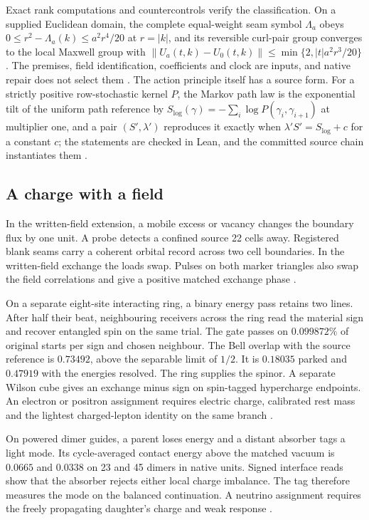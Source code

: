 \documentclass[11pt]{article}
\theoremstyle{definition}
\theoremstyle{remark}
\begin{document}
Exact rank computations and countercontrols verify the classification. On a supplied
Euclidean domain, the complete equal-weight seam symbol $\Lambda_a$ obeys
$0\leq r^2-\Lambda_a(k)\leq a^2r^4/20$ at $r=|k|$, and its reversible curl-pair group converges
to the local Maxwell group with $\|U_a(t,k)-U_0(t,k)\|\leq\min\{2,|t|a^2r^3/20\}$. The premises,
field identification, coefficients and clock are inputs, and native repair does not select them
\cite{ophMicrophysics}. The action principle itself has a source form. For a strictly positive
row-stochastic kernel $P$, the Markov path law is the exponential tilt of the uniform path
reference by $S_{\log}(\gamma)=-\sum_i\log P(\gamma_i,\gamma_{i+1})$ at multiplier one, and a pair
$(S',\lambda')$ reproduces it exactly when $\lambda'S'=S_{\log}+c$ for a constant $c$; the
statements are checked in Lean, and the committed source chain instantiates them
\cite{ophobservers}.

\subsection{A charge with a field}
\label{sec:charge}

In the written-field extension, a mobile excess or vacancy changes the
boundary flux by one unit. A probe detects a confined source 22 cells
away. Registered blank seams carry a coherent orbital record across two
cell boundaries. In the written-field exchange the loads swap. Pulses
on both marker triangles also swap the field correlations and give a
positive matched exchange phase \cite{ophmodel,ophparticles}.

On a separate eight-site interacting ring, a binary energy pass retains
two lines. After half their beat, neighbouring receivers across the
ring read the material sign and recover entangled spin on the same
trial. The gate passes on \(0.099872\%\) of original starts per sign and
chosen neighbour. The Bell overlap with the source reference is
\(0.73492\), above the separable limit of \(1/2\). It is \(0.18035\)
parked and \(0.47919\) with the energies resolved. The ring supplies the
spinor. A separate Wilson cube gives an exchange
minus sign on spin-tagged hypercharge endpoints. An electron or positron
assignment requires electric charge, calibrated rest mass and the
lightest charged-lepton identity on the same branch \cite{ophparticles}.

On powered dimer guides, a parent loses energy and a distant absorber
tags a light mode. Its cycle-averaged contact energy above the matched
vacuum is \(0.0665\) and \(0.0338\) on 23 and 45 dimers in native units.
Signed interface reads show that the
absorber rejects either local charge imbalance. The tag therefore
measures the mode on the balanced continuation. A neutrino assignment
requires the freely propagating daughter's charge and weak response
\cite{ophparticles,ophspine}.
\end{document}
